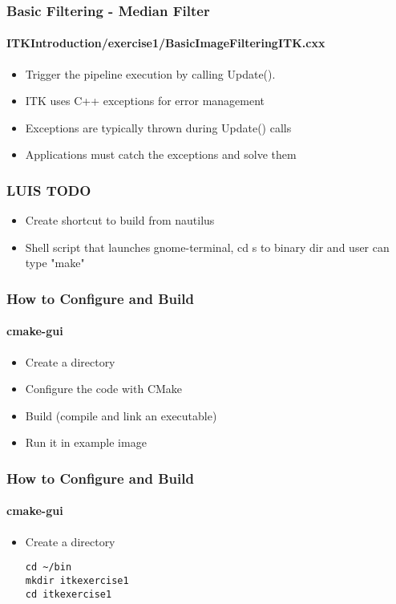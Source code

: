 {
\begin{frame}[fragile]
\frametitle{Basic Filtering - Median Filter}
\framesubtitle{ITKIntroduction/exercise1/BasicImageFilteringITK.cxx}
\begin{itemize}
\item Trigger the pipeline execution by calling Update().
\end{itemize}
\pause
\begin{itemize}
\item ITK uses C++ exceptions for error management
\item Exceptions are typically thrown during Update() calls
\item Applications must catch the exceptions and solve them
\end{itemize}
\end{frame}
}


\begin{frame}
\frametitle{LUIS TODO}
\begin{itemize}
\item Create shortcut to build from nautilus
\item Shell script that launches gnome-terminal, cd s to binary dir and user can type "make"
\end{itemize}
\end{frame}


\begin{frame}
\frametitle{How to Configure and Build}
\framesubtitle{cmake-gui}
\begin{itemize}
\item Create a directory
\item Configure the code with CMake
\item Build (compile and link an executable)
\item Run it in example image
\end{itemize}
\end{frame}

\begin{frame}[fragile]
\frametitle{How to Configure and Build}
\framesubtitle{cmake-gui}
\begin{itemize}
\item Create a directory
\begin{verbatim}
cd ~/bin
mkdir itkexercise1
cd itkexercise1
\end{verbatim}
\end{itemize}
\end{frame}

